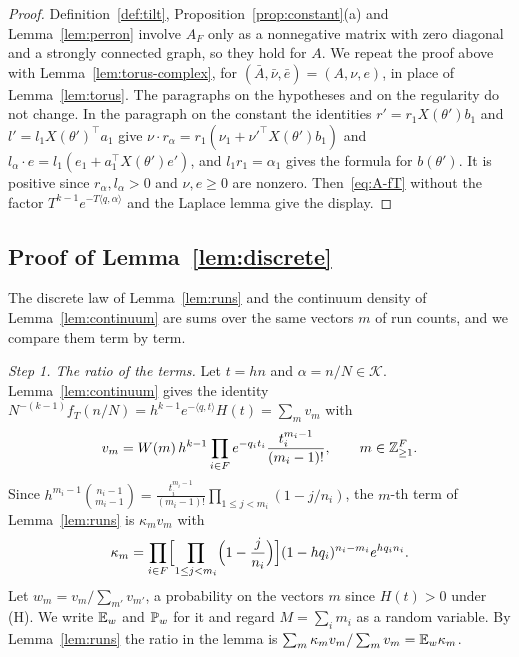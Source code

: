 \begin{proof}
Definition~\ref{def:tilt}, Proposition~\ref{prop:constant}(a) and Lemma~\ref{lem:perron} involve
$A_F$ only as a nonnegative matrix with zero diagonal and a strongly connected graph, so they
hold for $A$. We repeat the proof above with Lemma~\ref{lem:torus-complex}, for
$(\bar A,\bar\nu,\bar e)=(A,\nu,e)$, in place of Lemma~\ref{lem:torus}. The paragraphs on the
hypotheses and on the regularity do not change. In the paragraph on the constant the identities
$r'=r_1X(\theta')b_1$ and $l'=l_1X(\theta')^\top a_1$ give $\nu\cdot r_\alpha=r_1(\nu_1+\nu'^\top
X(\theta')b_1)$ and $l_\alpha\cdot e=l_1(e_1+a_1^\top X(\theta')e')$, and $l_1r_1=\alpha_1$ gives
the formula for $b(\theta')$. It is positive since $r_\alpha,l_\alpha>0$ and $\nu,e\ge0$ are
nonzero. Then~\eqref{eq:A-fT} without the factor $T^{k-1}e^{-T\langle q,\alpha\rangle}$ and the
Laplace lemma give the display.
\end{proof}

\subsection{Proof of \texorpdfstring{Lemma~\ref{lem:discrete}}{the discrete
law}}

The discrete law of Lemma~\ref{lem:runs} and the continuum density of
Lemma~\ref{lem:continuum} are sums over the same vectors $m$ of run counts, and
we compare them term by term.

\emph{Step 1. The ratio of the terms.} Let $t=hn$ and
$\alpha=n/N\in\mathcal K$. Lemma~\ref{lem:continuum} gives the identity
$N^{-(k-1)}f_T(n/N)=h^{k-1}e^{-\langle q,t\rangle}H(t)=\sum_mv_m$ with
\[
v_m=W(m)\,h^{k-1}\prod_{i\in F}e^{-q_it_i}\frac{t_i^{m_i-1}}{(m_i-1)!},
\qquad m\in\mathbb{Z}_{\ge1}^F .
\]
Since $h^{m_i-1}\binom{n_i-1}{m_i-1}=\frac{t_i^{m_i-1}}{(m_i-1)!}
\prod_{1\le j<m_i}(1-j/n_i)$, the $m$-th term of Lemma~\ref{lem:runs} is
$\kappa_mv_m$ with
\[
\kappa_m=\prod_{i\in F}\Bigl[\prod_{1\le j<m_i}\Bigl(1-\frac j{n_i}\Bigr)\Bigr]
(1-hq_i)^{n_i-m_i}e^{hq_in_i}.
\]
Let $w_m=v_m/\sum_{m'}v_{m'}$, a probability on the vectors $m$ since
$H(t)>0$ under (H). We write $\mathbb{E}_w$ and $\mathbb{P}_w$ for it and regard
$M=\sum_im_i$ as a random variable. By Lemma~\ref{lem:runs} the ratio in the
lemma is $\sum_m\kappa_mv_m/\sum_mv_m=\mathbb{E}_w\kappa_m$.

